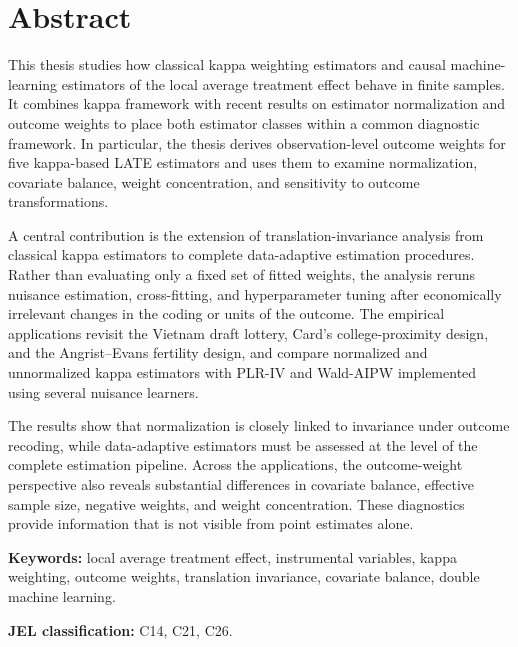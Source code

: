 \documentclass[12pt, a4paper, oneside]{article}
\theoremstyle{plain}
\theoremstyle{definition}
\begin{document}

\newpage
\section*{Abstract}

This thesis studies how classical kappa weighting estimators and causal
machine-learning estimators of the local average treatment effect behave in finite
samples. It combines \citet{abadie2003semiparametric} kappa framework with recent results on estimator
normalization and outcome weights to place both estimator classes within a common
diagnostic framework. In particular, the thesis derives observation-level outcome
weights for five kappa-based LATE estimators and uses them to examine normalization,
covariate balance, weight concentration, and sensitivity to outcome transformations.

A central contribution is the extension of translation-invariance analysis from
classical kappa estimators to complete data-adaptive estimation procedures. Rather than
evaluating only a fixed set of fitted weights, the analysis reruns nuisance estimation,
cross-fitting, and hyperparameter tuning after economically irrelevant changes in the
coding or units of the outcome. The empirical applications revisit the Vietnam draft
lottery, Card's college-proximity design, and the Angrist--Evans fertility design, and
compare normalized and unnormalized kappa estimators with PLR-IV and Wald-AIPW
implemented using several nuisance learners.

The results show that normalization is closely linked to invariance under outcome
recoding, while data-adaptive estimators must be assessed at the level of the complete
estimation pipeline. Across the applications, the outcome-weight perspective also
reveals substantial differences in covariate balance, effective sample size, negative
weights, and weight concentration. These diagnostics provide information that is not
visible from point estimates alone.

\bigskip
\noindent\textbf{Keywords:} local average treatment effect, instrumental variables,
kappa weighting, outcome weights, translation invariance, covariate balance,
double machine learning.

\bigskip
\noindent\textbf{JEL classification:} C14, C21, C26.
\newpage
\tableofcontents
\end{document}
